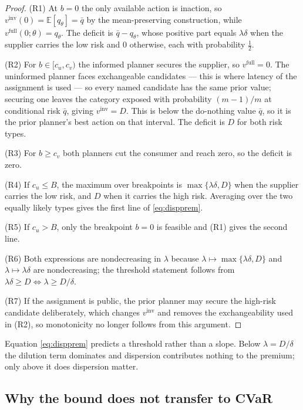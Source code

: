 \documentclass[pdflatex,sn-mathphys-num]{sn-jnl}
\theoremstyle{thmstyleone}
\theoremstyle{thmstyletwo}
\theoremstyle{thmstylethree}
\begin{document}
\begin{proof}
(R1) At $b=0$ the only available action is inaction, so
$v^{\mathrm{inv}}(0)=\mathbb{E}[q_\theta]=\bar q$ by the mean-preserving
construction, while $v^{\mathrm{full}}(0;\theta)=q_\theta$. The deficit is
$\bar q-q_\theta$, whose positive part equals $\lambda\delta$ when the
supplier carries the low risk and $0$ otherwise, each with probability
$\tfrac12$.

\noindent(R2) For $b\in[c_u,c_v)$ the informed planner secures the supplier,
so $v^{\mathrm{full}}=0$. The uninformed planner faces exchangeable
candidates --- this is where latency of the assignment is used --- so every
named candidate has the same prior value; securing one leaves the category
exposed with probability $(m-1)/m$ at conditional risk $\bar q$, giving
$v^{\mathrm{inv}}=D$. This is below the do-nothing value $\bar q$, so it is
the prior planner's best action on that interval. The deficit is $D$ for
both risk types.

\noindent(R3) For $b\ge c_v$ both planners cut the consumer and reach zero,
so the deficit is zero.

\noindent(R4) If $c_u\le B$, the maximum over breakpoints is
$\max\{\lambda\delta,D\}$ when the supplier carries the low risk, and $D$
when it carries the high risk. Averaging over the two equally likely types
gives the first line of \eqref{eq:dispprem}.

\noindent(R5) If $c_u>B$, only the breakpoint $b=0$ is feasible and (R1)
gives the second line.

\noindent(R6) Both expressions are nondecreasing in $\lambda$ because
$\lambda\mapsto\max\{\lambda\delta,D\}$ and $\lambda\mapsto\lambda\delta$
are nondecreasing; the threshold statement follows from
$\lambda\delta\ge D\iff\lambda\ge D/\delta$.

\noindent(R7) If the assignment is public, the prior planner may secure the
high-risk candidate deliberately, which changes $v^{\mathrm{inv}}$ and
removes the exchangeability used in (R2), so monotonicity no longer follows
from this argument.
\end{proof}

Equation \eqref{eq:dispprem} predicts a threshold rather than a slope. Below
$\lambda=D/\delta$ the dilution term dominates and dispersion contributes
nothing to the premium; only above it does dispersion matter.

\subsection{Why the bound does not transfer to CVaR}\label{sec:cvarhonest}
\end{document}
